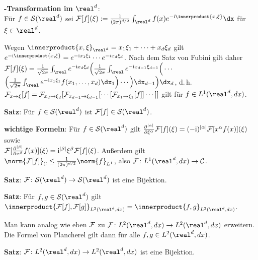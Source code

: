 \linie

\textbf{-Transformation im $\real^d$}:\\
Für $f \in \S(\real^d)$ sei $\F[f](\xi) := \frac{1}{(2\pi)^{d/2}}
\int_{\real^d} f(x) e^{-\i\innerproduct{x, \xi}} \dx$ für $\xi \in \real^d$.

Wegen $\innerproduct{x, \xi}_{\real^d} = x_1 \xi_1 + \dotsb + x_d \xi_d$ gilt
$e^{-\i\innerproduct{x, \xi}} = e^{-\i x_1 \xi_1} \dotsm e^{-i x_d \xi_d}$.
Nach dem Satz von Fubini gilt daher
$\F[f](\xi) = \frac{1}{\sqrt{2\pi}} \int_\real e^{-\i x_d \xi_d}
\Big(\frac{1}{\sqrt{2\pi}} \int_\real e^{-\i x_{d-1} \xi_{d-1}}
\Big(\dotsb$\\
$\Big(\frac{1}{\sqrt{2\pi}} \int_\real e^{-\i x_1 \xi_1}
f(x_1, \dotsc, x_d) \dx_1\Big)\dotsb\Big)\dx_{d-1}\Big)\dx_d$, d.\,h.\\
$\mathcal{F}_{x \to \xi}[f] = \mathcal{F}_{x_d \to \xi_d}[\mathcal{F}_{x_{d-1} \to \xi_{d-1}}[\dotsb[
\mathcal{F}_{x_1 \to \xi_1}[f]]\dotsb]]$
gilt für $f \in L^1(\real^d, dx)$.

\textbf{Satz}:
Für $f \in \S(\real^d)$ ist $\F[f] \in \S(\real^d)$.

\textbf{wichtige Formeln}:
Für $f \in \S(\real^d)$ gilt
$\frac{\partial^{|\alpha|}}{\partial \xi^\alpha} \mathcal{F}[f](\xi) =
(-\mathrm{i})^{|\alpha|} \mathcal{F}[x^\alpha f(x)](\xi)$ sowie\\
$\mathcal{F}[\frac{\partial^{|\beta|}}{\partial x^\beta} f(x)](\xi) =
\mathrm{i}^{|\beta|} \xi^\beta \mathcal{F}[f](\xi)$.
Außerdem gilt
$\norm{\F[f]}_\C \le \frac{1}{(2\pi)^{d/2}} \norm{f}_{L^1}$,
also $\F\colon L^1(\real^d, dx) \rightarrow \C$.

\textbf{Satz}:
$\F\colon \S(\real^d) \rightarrow \S(\real^d)$ ist eine Bijektion.

\textbf{Satz}:
Für $f, g \in \S(\real^d)$ gilt
$\innerproduct{\F[f], \F[g]}_{L^2(\real^d, dx)} = \innerproduct{f, g}_{L^2(\real^d, dx)}$.

Man kann analog wie eben $\mathcal{F}$ zu
$\F\colon L^2(\real^d, dx) \rightarrow L^2(\real^d, dx)$ erweitern.
Die Formel von Plancherel gilt dann für alle $f, g \in L^2(\real^d, dx)$.

\textbf{Satz}:
$\F\colon L^2(\real^d, dx) \rightarrow L^2(\real^d, dx)$ ist eine Bijektion.

\pagebreak
